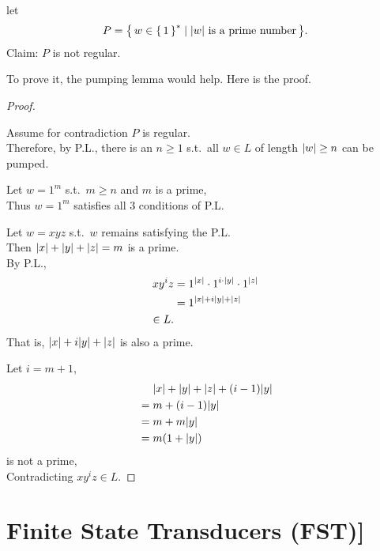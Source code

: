 

\begin{example}[]
    let
    \[
        P = { \left\{\, w \in { \left\{\,1\,\right\} }^* \mid \text{${ \left\lvert w \right\rvert }$ is a prime number} \,\right\} }.
    \]
    Claim: $P$ is not regular.

    To prove it, the pumping lemma would help. Here is the proof.
    \begin{proof}\ 

        Assume for contradiction $P$ is regular. \\
        Therefore, by P.L.,
        there is an $n \ge 1$ s.t.\
        all $w \in L$ of length ${ \left\lvert w \right\rvert } \ge n$ can be pumped.

        Let $w = 1^m$ s.t.\ $m \ge n$ and $m$ is a prime, \\
        Thus $w = 1^m$ satisfies all 3 conditions of P.L.

        Let
        $w = xyz$ s.t.\ $w$ remains satisfying the P.L. \\
        Then ${ \left\lvert x \right\rvert } + { \left\lvert y \right\rvert } + { \left\lvert z \right\rvert } = m$ is a prime. \\
        By P.L.,
        \begin{align*}
            x y^i z
            &= 1^{{ \left\lvert x \right\rvert }} \cdot 1^{i \cdot { \left\lvert y \right\rvert }} \cdot 1^{{ \left\lvert z \right\rvert }}  \\
            &= 1^{{ \left\lvert x \right\rvert } + i { \left\lvert y \right\rvert } + { \left\lvert z \right\rvert }}  \\
            \in L
        .\end{align*}
        That is,
        ${{ \left\lvert x \right\rvert } + i { \left\lvert y \right\rvert } + { \left\lvert z \right\rvert }}$
        is also a prime.

        Let
        $i = m+1$,
        \begin{align*}
            &\phteq \abs x + \abs y + \abs z + (i-1)\abs y  \\
            &=      m + (i-1)\abs y  \\
            &=      m + m\abs y  \\
            &=      m(1+\abs y)
            \end{align*}
        is not a prime, \\
        Contradicting
        $xy^iz \in L$.
    \end{proof}

\end{example}

\section{Finite State Transducers (FST)]}

